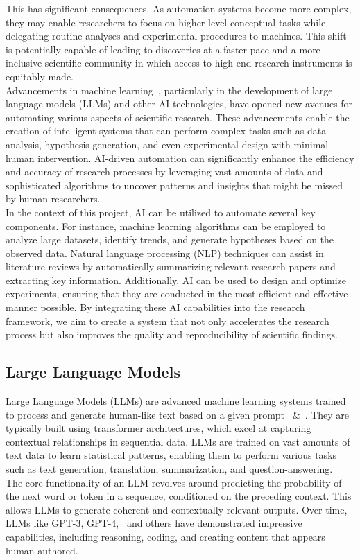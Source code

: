 This has significant consequences. As automation systems become more complex, they may enable researchers to focus on higher-level conceptual tasks while delegating routine analyses and experimental procedures to machines. This shift is potentially capable of leading to discoveries at a faster pace and a more inclusive scientific community in which access to high-end research instruments is equitably made.\\
Advancements in machine learning~\cite{Goodfellow2016DeepLearning}, particularly in the development of large language models (LLMs) and other AI technologies, have opened new avenues for automating various aspects of scientific research. These advancements enable the creation of intelligent systems that can perform complex tasks such as data analysis, hypothesis generation, and even experimental design with minimal human intervention. AI-driven automation can significantly enhance the efficiency and accuracy of research processes by leveraging vast amounts of data and sophisticated algorithms to uncover patterns and insights that might be missed by human researchers.\\
In the context of this project, AI can be utilized to automate several key components. For instance, machine learning algorithms can be employed to analyze large datasets, identify trends, and generate hypotheses based on the observed data. Natural language processing (NLP) techniques can assist in literature reviews by automatically summarizing relevant research papers and extracting key information. Additionally, AI can be used to design and optimize experiments, ensuring that they are conducted in the most efficient and effective manner possible. By integrating these AI capabilities into the research framework, we aim to create a system that not only accelerates the research process but also improves the quality and reproducibility of scientific findings.

\subsection{Large Language Models}
Large Language Models (LLMs) are advanced machine learning systems trained to process and generate human-like text based on a given prompt~\cite{2023arXiv231211805G} \&~\cite{2024arXiv240721783G}. They are typically built using transformer architectures, which excel at capturing contextual relationships in sequential data. LLMs are trained on vast amounts of text data to learn statistical patterns, enabling them to perform various tasks such as text generation, translation, summarization, and question-answering. \\
The core functionality of an LLM revolves around predicting the probability of the next word or token in a sequence, conditioned on the preceding context. This allows LLMs to generate coherent and contextually relevant outputs. Over time, LLMs like GPT-3, GPT-4,~\cite{openai2023} and others have demonstrated impressive capabilities, including reasoning, coding, and creating content that appears human-authored.


